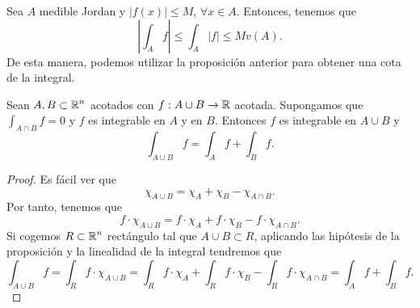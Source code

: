 \begin{observation}
Sea $\displaystyle A $ medible Jordan y $\displaystyle \left|f\left(x\right)\right| \leq M $, $\displaystyle \forall x \in A $. Entonces, tenemos que 
\[ \left|\int _{A}f \right|\leq \int _{A} \left|f\right| \leq M v\left(A\right) .\]
De esta manera, podemos utilizar la proposición anterior para obtener una cota de la integral.
\end{observation}

\begin{prop}
Sean $\displaystyle A, B \subset \mathbb{R}^{n} $ acotados con $\displaystyle f : A \cup B\to \mathbb{R} $ acotada. Supongamos que $\displaystyle \int _{A \cap B}f = 0 $ y $\displaystyle f $ es integrable en $\displaystyle A $ y en $\displaystyle B $. Entonces $\displaystyle f $ es integrable en $\displaystyle A \cup B $ y 
\[\int _{A \cup B}f = \int _{A}f + \int _{B}f  .\]
\end{prop}
\begin{proof}
Es fácil ver que 
	\[\chi_{A \cup B} = \chi_{A} + \chi_{B} - \chi_{A \cap B} .\]
Por tanto, tenemos que 
\[f \cdot \chi_{A \cup B} = f \cdot \chi_{A} + f \cdot \chi_{B} - f \cdot \chi_{A \cap B} .\]
Si cogemos $\displaystyle R \subset \mathbb{R}^{n} $ rectángulo tal que $\displaystyle A \cup B \subset R $, aplicando las hipótesis de la proposición y la linealidad de la integral tendremos que
\[\int _{A \cup B}f = \int _{R}f \cdot \chi_{A \cup B} = \int _{R} f \cdot \chi_{A} + \int _{R} f \cdot \chi_{B}  - \int _{R} f \cdot \chi_{A \cap B}  = \int _{A}f + \int _{B}f  .\]
\end{proof}

